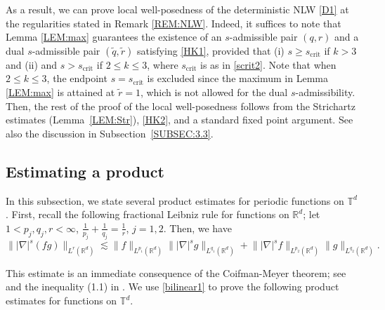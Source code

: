 \documentclass[letterpaper, 11pt,  reqno]{amsart}
\newcommand{\1}{\hspace{0.5mm}\text{I}\hspace{0.5mm}}
\newcommand{\noi}{\noindent}
\newcommand{\R}{\mathbb{R}}
\newcommand{\T}{\mathbb{T}}
\newcommand{\nb}{\nabla}
\newcommand{\wt}{\widetilde}
\newcommand{\les}{\lesssim}
\numberwithin{equation}{section}
\numberwithin{theorem}{section}
\begin{document}
As a result,  we can prove local well-posedness of the deterministic NLW
\eqref{D1} at the regularities stated in Remark \ref{REM:NLW}.
Indeed, it suffices to note that 
Lemma \ref{LEM:max} guarantees the existence of 
 an $s$-admissible pair $(q, r)$ and a dual $s$-admissible pair $(\wt q, \wt r)$
 satisfying \eqref{HK1},
 provided that 
  (i) $s \geq     s_\text{crit}$ if $k >3$ 
and (ii) 
and $s> s_\text{crit}$ if $ 2 \leq k \leq 3$, 
where $s_\text{crit}$ is as in \eqref{scrit2}.
Note that when $ 2 \leq k \leq 3$, 
 the endpoint $s = s_\text{crit}$ is excluded 
 since the maximum in Lemma \ref{LEM:max} is attained
 at $\wt r = 1$, which is not allowed for  the dual $s$-admissibility.
 Then, the rest of the proof of the local well-posedness follows
 from  the Strichartz estimates (Lemma~\ref{LEM:Str}), \eqref{HK2}, and 
a standard fixed point argument.
See also the discussion in Subsection~\ref{SUBSEC:3.3}.








\subsection{Estimating a product}


In this subsection, we state several product estimates
for periodic functions on $\T^d$.
First, recall the following fractional Leibniz rule
for functions on $\R^d$;
let 
 $1<p_j,q_j,r < \infty$, $\frac1{p_j} + \frac1{q_j}= \frac1r$, $j = 1, 2$. 
 Then, we have  
\begin{equation} 
\big\| |\nb|^s (fg) \big\|_{L^r(\R^d)} 
\les  \big\| f \big\|_{L^{p_1}(\R^d)} \big\| |\nb|^s g \big\|_{L^{q_1}(\R^d)} 
+ \big\| |\nb|^s f \big\|_{L^{p_2}(\R^d)}  \big\| g \big\|_{L^{q_2}(\R^d)}. 
\label{bilinear1}
\end{equation}  

\noi
This estimate is an immediate consequence of 
 the Coifman-Meyer theorem; see \cite{CM} and the inequality (1.1) in \cite{MS}.    
We use \eqref{bilinear1} to prove  the following product estimates
for functions on $\T^d$.
\end{document}
